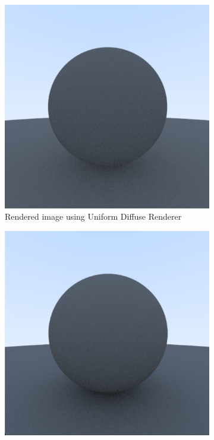 \documentclass[12pt]{article}
\begin{document}
\begin{figure}[H]
    \centering
    \begin{subfigure}[b]{0.45\textwidth}
        \centering
        \includegraphics[width=\textwidth]{images/uniform_diffuse.png}
        \caption{Rendered image using Uniform Diffuse Renderer}
        \label{fig:completely_diffuse}
    \end{subfigure}
    \hfill
    \begin{subfigure}[b]{0.45\textwidth}
        \centering
        \includegraphics[width=\textwidth]{images/lambertian_diffuse.png}

\end{subfigure}
\end{figure}
\end{document}
